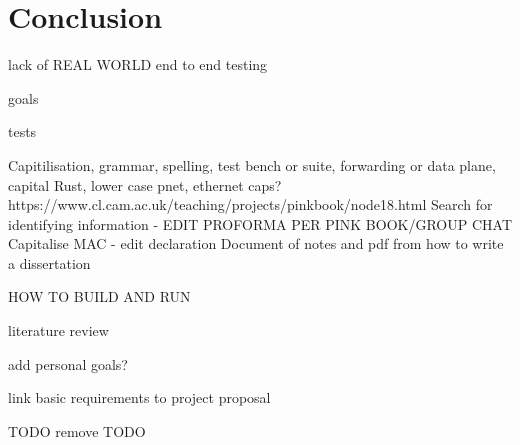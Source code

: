 \documentclass[12pt,a4paper,twoside,openright]{report}
\begin{document}
\chapter{Conclusion}

lack of REAL WORLD end to end testing

goals

tests

Capitilisation, grammar, spelling, test bench or suite, forwarding or data plane, capital Rust, lower case pnet, ethernet caps?
https://www.cl.cam.ac.uk/teaching/projects/pinkbook/node18.html
Search for identifying information - EDIT PROFORMA PER PINK BOOK/GROUP CHAT
Capitalise MAC - edit declaration
Document of notes and pdf from how to write a dissertation


HOW TO BUILD AND RUN

literature review

add personal goals?

link basic requirements to project proposal

TODO remove TODO
\end{document}
